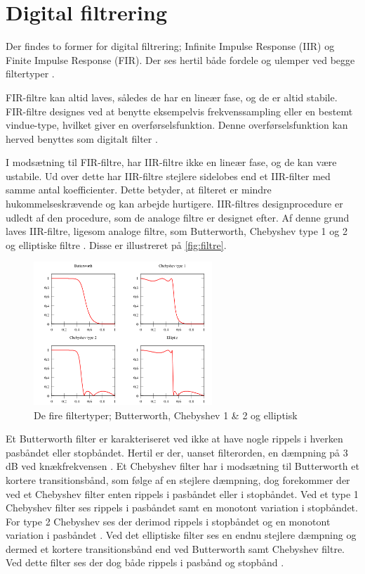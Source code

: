 \section{Digital filtrering}
Der findes to former for digital filtrering; Infinite Impulse Response (IIR) og Finite Impulse Response (FIR). Der ses hertil både fordele og ulemper ved begge filtertyper \citep{blandford2012}.

FIR-filtre kan altid laves, således de har en lineær fase, og de er altid stabile. FIR-filtre designes ved at benytte eksempelvis frekvenssampling eller en bestemt vindue-type, hvilket giver en overførselsfunktion. Denne overførselsfunktion kan herved benyttes som digitalt filter \citep{blandford2012}. 

I modsætning til FIR-filtre, har IIR-filtre ikke en lineær fase, og de kan være ustabile. Ud over dette har IIR-filtre stejlere sidelobes end et IIR-filter med samme antal koefficienter. Dette betyder, at filteret er mindre hukommelseskrævende og kan arbejde hurtigere. IIR-filtres designprocedure er udledt af den procedure, som de analoge filtre er designet efter. Af denne grund laves IIR-filtre, ligesom analoge filtre, som Butterworth, Chebyshev type 1 og 2 og elliptiske filtre \citep{blandford2012}. Disse er illustreret på \autoref{fig:filtre}. 
\\

\begin{figure}[H]
\centering
\includegraphics[width=0.6\textwidth]{figures/filtre}
\caption{De fire filtertyper; Butterworth, Chebyshev 1 \& 2 og elliptisk \citep{wikipedia2016}}
\label{fig:filtre}
\end{figure}

\noindent
Et Butterworth filter er karakteriseret ved ikke at have nogle rippels i hverken pasbåndet eller stopbåndet. Hertil er der, uanset filterorden, en dæmpning på 3 dB ved knækfrekvensen \citep{nilsson2015}.
Et Chebyshev filter har i modsætning til Butterworth et kortere transitionsbånd, som følge af en stejlere dæmpning, dog forekommer der ved et Chebyshev filter enten rippels i pasbåndet eller i stopbåndet. Ved et type 1 Chebyshev filter ses rippels i pasbåndet samt en monotont variation i stopbåndet. For type 2 Chebyshev ses der derimod rippels i stopbåndet og en monotont variation i pasbåndet \citep{nilsson2015}. 
Ved det elliptiske filter ses en endnu stejlere dæmpning og dermed et kortere transitionsbånd end ved Butterworth samt Chebyshev filtre. Ved dette filter ses der dog både rippels i pasbånd og stopbånd \citep{nilsson2015}. 


